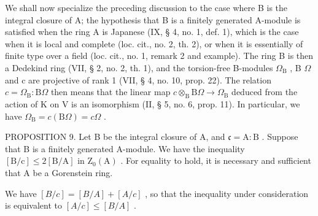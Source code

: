 We shall now specialize the preceding discussion to the case where B is the integral closure of A; the hypothesis that B is a finitely generated A-module is satisfied when the ring A is Japanese (IX, § 4, no. 1, def. 1), which is the case when it is local and complete (loc. cit., no. 2, th. 2), or when it is essentially of finite type over a field (loc. cit., no. 1, remark 2 and example). The ring B is then a Dedekind ring (VII, § 2, no. 2, th. 1), and the torsion-free B-modules \(\Omega_{\mathrm{B}}\) , B \(\Omega\) and c are projective of rank 1 (VII, § 4, no. 10, prop. 22). The relation \(c = \Omega_{\mathrm{B}} : \mathrm{B}\Omega\) then means that the linear map \(c \otimes_{\mathrm{B}} \mathrm{B}\Omega \to \Omega_{\mathrm{B}}\) deduced from the action of K on V is an isomorphism (II, § 5, no. 6, prop. 11). In particular, we have \(\Omega_{\mathrm{B}} = c(\mathrm{B}\Omega) = c\Omega\) .

PROPOSITION 9. Let B be the integral closure of A, and \(\mathfrak{c} = \mathrm{A}:\mathrm{B}\) . Suppose that B is a finitely generated A-module. We have the inequality \([\mathrm{B} / \mathrm{c}] \leqslant 2[\mathrm{B} / \mathrm{A}]\) in \(\mathrm{Z}_0(\mathrm{A})\) . For equality to hold, it is necessary and sufficient that A be a Gorenstein ring.

We have \([B/c] = [B/A] + [A/c]\) , so that the inequality under consideration is equivalent to \([A/c] \leqslant [B/A]\) .

